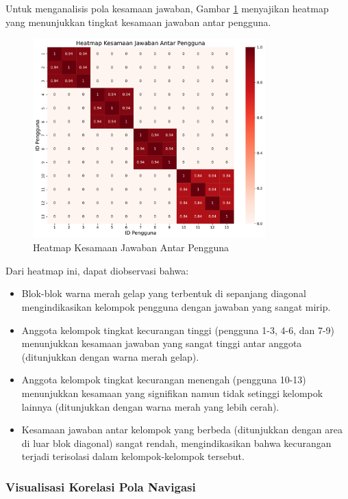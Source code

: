 Untuk menganalisis pola kesamaan jawaban, Gambar \ref{fig:answer_similarity_heatmap} menyajikan heatmap yang menunjukkan tingkat kesamaan jawaban antar pengguna.

\begin{figure}[htbp]
    \centering
    \includegraphics[width=0.8\textwidth]{figures/answer_similarity_heatmap.pdf}
    \caption{Heatmap Kesamaan Jawaban Antar Pengguna}
    \label{fig:answer_similarity_heatmap}
\end{figure}

Dari heatmap ini, dapat diobservasi bahwa:
\begin{itemize}
    \item Blok-blok warna merah gelap yang terbentuk di sepanjang diagonal mengindikasikan kelompok pengguna dengan jawaban yang sangat mirip.
    \item Anggota kelompok tingkat kecurangan tinggi (pengguna 1-3, 4-6, dan 7-9) menunjukkan kesamaan jawaban yang sangat tinggi antar anggota (ditunjukkan dengan warna merah gelap).
    \item Anggota kelompok tingkat kecurangan menengah (pengguna 10-13) menunjukkan kesamaan yang signifikan namun tidak setinggi kelompok lainnya (ditunjukkan dengan warna merah yang lebih cerah).
    \item Kesamaan jawaban antar kelompok yang berbeda (ditunjukkan dengan area di luar blok diagonal) sangat rendah, mengindikasikan bahwa kecurangan terjadi terisolasi dalam kelompok-kelompok tersebut.
\end{itemize}

\subsubsection{Visualisasi Korelasi Pola Navigasi}

